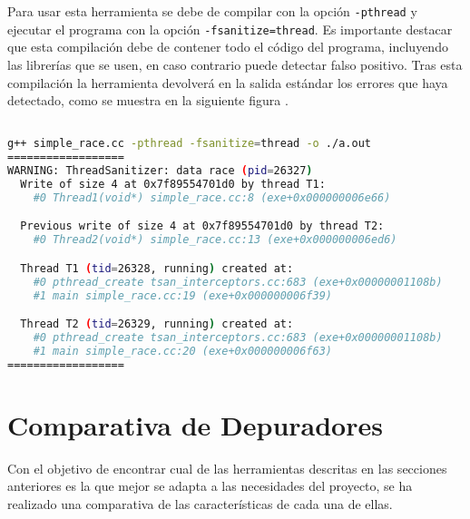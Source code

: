 Para usar esta herramienta se debe de compilar con la opción \texttt{-pthread} y ejecutar el programa con la opción \texttt{-fsanitize=thread}. Es importante destacar que esta \gls{compilación} debe de contener todo el código del programa, incluyendo las librerías que se usen, en caso contrario puede detectar \gls{falso positivo}. Tras esta \gls{compilación} la herramienta devolverá en la \gls{salida estándar} los errores que haya detectado, como se muestra en la siguiente figura \cite{ThreadSanitizer}.

\begin{lstlisting}[language=bash, caption={Muestra de salida de ThreadSanitizer al detectar un error de condición de carrera \cite{ThreadSanitizerGithub}}]

g++ simple_race.cc -pthread -fsanitize=thread -o ./a.out 
==================
WARNING: ThreadSanitizer: data race (pid=26327)
  Write of size 4 at 0x7f89554701d0 by thread T1:
    #0 Thread1(void*) simple_race.cc:8 (exe+0x000000006e66)

  Previous write of size 4 at 0x7f89554701d0 by thread T2:
    #0 Thread2(void*) simple_race.cc:13 (exe+0x000000006ed6)

  Thread T1 (tid=26328, running) created at:
    #0 pthread_create tsan_interceptors.cc:683 (exe+0x00000001108b)
    #1 main simple_race.cc:19 (exe+0x000000006f39)

  Thread T2 (tid=26329, running) created at:
    #0 pthread_create tsan_interceptors.cc:683 (exe+0x00000001108b)
    #1 main simple_race.cc:20 (exe+0x000000006f63)
==================

\end{lstlisting}

\section{Comparativa de Depuradores}\label{sec:comparativa-depuradores}
Con el objetivo de encontrar cual de las herramientas descritas en las secciones anteriores es la que mejor se adapta a las necesidades del proyecto, se ha realizado una comparativa de las características de cada una de ellas. 

